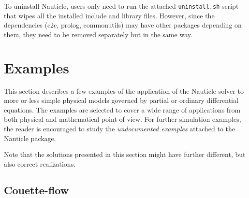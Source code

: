 \documentclass[a4paper,12pt,openany]{book}
\theoremstyle{break}
\begin{document}
To uninstall Nauticle, users only need to run the attached \texttt{uninstall.sh} script that wipes all the installed include and library files. However, since the dependencies (c2c, prolog, commonutils) may have other packages depending on them, they need to be removed separately but in the same way.

\section{Examples} \label{sec:examples}
This section describes a few examples of the application of the Nauticle solver to more or less simple physical models governed by partial or ordinary differential equations. The examples are selected to cover a wide range of applications from both physical and mathematical point of view. For further simulation examples, the reader is encouraged to study the \textit{undocumented examples} attached to the Nauticle package.

Note that the solutions presented in this section might have further different, but also correct realizations.
\subsection{Couette-flow}
\end{document}
